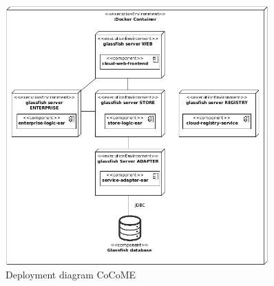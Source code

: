	\begin{figure}[h]
		\centering
		\includegraphics[width = 0.9\textwidth]{img/docker_Container_Deployment.png}
		\caption{Deployment diagram CoCoME}
		\label{Deploym_CoCoME}
	\end{figure}
	
